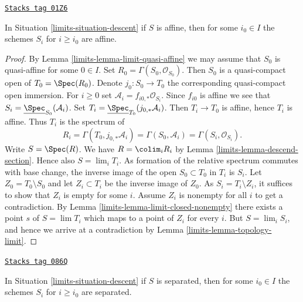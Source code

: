 \begin{lemma}
\label{limits-lemma-limit-affine}
\href{https://stacks.math.columbia.edu/tag/01Z6}{\texttt{Stacks tag 01Z6}}

In Situation \ref{limits-situation-descent} if $S$ is affine,
then for some $i_0 \in I$ the schemes $S_i$ for $i \geq i_0$
are affine.
\end{lemma}

\begin{proof}

By Lemma \ref{limits-lemma-limit-quasi-affine} we may assume that $S_0$ is
quasi-affine for some $0 \in I$. Set $R_0 = \Gamma(S_0, \mathcal{O}_{S_0})$.
Then $S_0$ is a quasi-compact open of $T_0 = \Spec(R_0)$. Denote
$j_0 : S_0 \to T_0$ the corresponding quasi-compact open immersion.
For $i \geq 0$ set $\mathcal{A}_i = f_{i0, *}\mathcal{O}_{S_i}$.
Since $f_{i0}$ is affine we see that
$S_i = \underline{\Spec}_{S_0}(\mathcal{A}_i)$.
Set $T_i = \underline{\Spec}_{T_0}(j_{0, *}\mathcal{A}_i)$.
Then $T_i \to T_0$ is affine, hence $T_i$ is affine. Thus
$T_i$ is the spectrum of
$$
R_i = \Gamma(T_0, j_{0, *}\mathcal{A}_i) = \Gamma(S_0, \mathcal{A}_i) =
\Gamma(S_i, \mathcal{O}_{S_i}).
$$
Write $S = \Spec(R)$. We have $R = \colim_i R_i$
by Lemma \ref{limits-lemma-descend-section}.
Hence also $S = \lim_i T_i$. As formation of the relative spectrum commutes
with base change, the inverse image
of the open $S_0 \subset T_0$ in $T_i$ is $S_i$.
Let $Z_0 = T_0 \setminus S_0$ and let $Z_i \subset T_i$
be the inverse image of $Z_0$. As $S_i = T_i \setminus Z_i$, it suffices
to show that $Z_i$ is empty for some $i$. Assume $Z_i$ is nonempty for all
$i$ to get a contradiction. By Lemma \ref{limits-lemma-limit-closed-nonempty}
there exists a point $s$ of $S = \lim T_i$ which maps to a point of $Z_i$
for every $i$. But $S = \lim_i S_i$, and hence we arrive at a contradiction
by Lemma \ref{limits-lemma-topology-limit}.
\end{proof}

\begin{lemma}
\label{limits-lemma-limit-separated}
\href{https://stacks.math.columbia.edu/tag/086Q}{\texttt{Stacks tag 086Q}}

In Situation \ref{limits-situation-descent} if $S$ is separated,
then for some $i_0 \in I$ the schemes $S_i$ for $i \geq i_0$
are separated.
\end{lemma}

